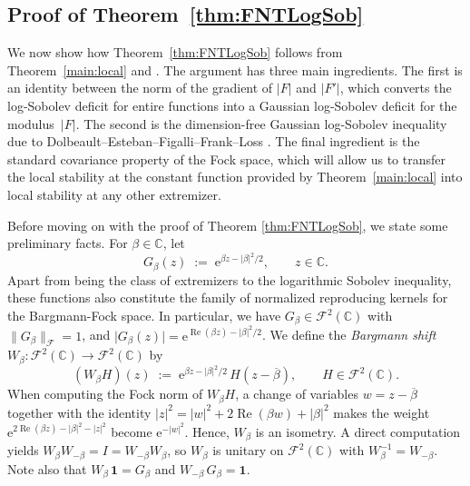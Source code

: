 \documentclass[11pt]{amsart}
\theoremstyle{remark}
\newcommand{\C}{\mathbb{C}}
\newcommand{\abs}[1]{\lvert #1 \rvert}
\newcommand{\norm}[1]{\lVert #1 \rVert}
\newcommand{\ee}{\mathrm{e}}
\begin{document}
\subsection{Proof of Theorem~\ref{thm:FNTLogSob}}\label{subsec:FNTproof}

We now show how Theorem~\ref{thm:FNTLogSob} follows from
Theorem~\ref{main:local} and
\cite[Corollary~1.2]{DolbeaultEstebanFigalliFrankLoss2025}.  The argument
has three main ingredients. The first is an identity between the norm of the gradient of $|F|$ and $|F'|$,
which converts the log-Sobolev deficit for entire functions into a Gaussian
log-Sobolev deficit for the modulus~$\abs{F}$. The second is the dimension-free
 Gaussian log-Sobolev inequality due to
Dolbeault--Esteban--Figalli--Frank--Loss \cite{DolbeaultEstebanFigalliFrankLoss2025}. The final ingredient is the standard covariance property of the
Fock space, which will allow us to transfer the local stability at
the constant function provided by Theorem~\ref{main:local} into local stability at any other extremizer. 
 \vspace{0.5em}

Before moving on with the proof of Theorem \ref{thm:FNTLogSob}, we state some preliminary facts. 
For $\beta \in \C$, let
\[
G_\beta(z) \;:=\; \ee^{\beta z - \abs{\beta}^2/2},
\qquad z \in \C.
\]
Apart from being the class of extremizers to the logarithmic Sobolev inequality, these functions also constitute the family of normalized reproducing kernels for the Bargmann-Fock space. In particular, we have $G_\beta \in \mathcal{F}^2(\C)$ with $\norm{G_\beta}_{\mathcal{F}} = 1$,
and $\abs{G_\beta(z)}
= \ee^{\operatorname{Re}(\beta z) - \abs{\beta}^2/2}$.
We define the \emph{Bargmann shift}
$W_\beta : \mathcal{F}^2(\C) \to \mathcal{F}^2(\C)$ by
\[
(W_\beta H)(z)
\;:=\; \ee^{\beta z - \abs{\beta}^2/2}\, H(z - \overline{\beta}),
\qquad H \in \mathcal{F}^2(\C).
\]
When computing the Fock norm of $W_\beta H$, a change of variables $w = z - \overline{\beta}$ 
together with the identity
$\abs{z}^2 = \abs{w}^2 + 2\operatorname{Re}(\beta w) + \abs{\beta}^2$
makes the weight
$\ee^{2 \operatorname{Re}(\beta z) - \abs{\beta}^2 - \abs{z}^2}$
become $\ee^{-\abs{w}^2}$. Hence, $W_{\beta}$ is an isometry.  A direct
computation yields $W_\beta W_{-\beta} = I = W_{-\beta} W_\beta$, so $W_\beta$
is unitary on $\mathcal{F}^2(\C)$ with $W_\beta^{-1} = W_{-\beta}$.
Note also that $W_\beta\, \mathbf{1} = G_\beta$ and
$W_{-\beta}\, G_\beta = \mathbf{1}$.
 \vspace{0.5em}
\end{document}
